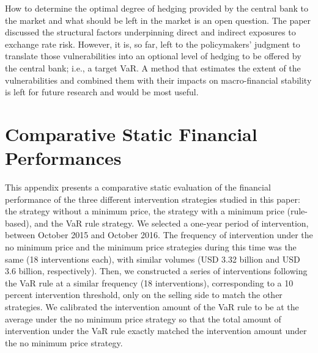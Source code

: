 \documentclass[11pt]{article}
\begin{document}
How to determine the optimal degree of hedging provided by the central bank to
the market  and what should  be left  in the market  is an open  question. The
paper  discussed  the  structural  factors underpinning  direct  and  indirect
exposures  to  exchange rate  risk.   However,  it is,  so  far,  left to  the
policymakers'  judgment to  translate those  vulnerabilities into  an optional
level of  hedging to be  offered by  the central bank;  i.e., a target  VaR. A
method that estimates the extent of the vulnerabilities and combined them with
their impacts  on macro-financial  stability is left  for future  research and
would be most useful.\\



\singlespacing



\appendix 
\section{Comparative Static Financial Performances}
\label{sec:fin-perf}

This  appendix  presents a  comparative  static  evaluation of  the  financial
performance of  the three  different intervention  strategies studied  in this
paper: the strategy without a minimum price, the strategy with a minimum price
(rule-based), and  the VaR  rule strategy.  We selected  a one-year  period of
intervention,  between  October  2015  and  October  2016.  The  frequency  of
intervention  under the  no minimum  price  and the  minimum price  strategies
during this  time was the same  (18 interventions each), with  similar volumes
(USD 3.32 billion  and USD 3.6 billion, respectively). Then,  we constructed a
series of  interventions following  the VaR  rule at  a similar  frequency (18
interventions), corresponding to a 10  percent intervention threshold, only on
the selling side to match the other strategies. We calibrated the intervention
amount  of the  VaR rule  to be  at  the average  under the  no minimum  price
strategy so that  the total amount of intervention under  the VaR rule exactly
matched the intervention amount under the no minimum price strategy.\\
\end{document}
